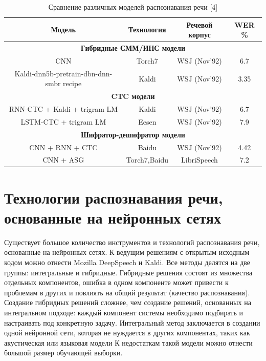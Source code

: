 \documentclass[conference]{IEEEtran}
\begin{document}
    \begin{table}[htp]
        \caption{Сравнение различных моделей распознавания речи [4]}
        \begin{center}
            \begin{tabular}{|c|c|c|c|}
                \hline
                Модель & Технология & Речевой корпус & WER \% \\
                \hline
                \multicolumn{4}{|c|}{\textbf{Гибридные СММ/ИНС модели}} \\
                \hline
                CNN & Torch7 & WSJ (Nov’92) & 6.7 \\
                \hline
                Kaldi-dnn5b-pretrain-dbn-dnn-smbr recipe & Kaldi & WSJ (Nov’92) & 3.35 \\
                \hline
                \multicolumn{4}{|c|}{\textbf{CTC модели}} \\
                \hline
                RNN-CTC + Kaldi + trigram LM & Kaldi & WSJ (Nov’92) & 6.7 \\
                \hline
                LSTM-CTC + trigram LM & Eesen & WSJ (Nov’92) & 7.9 \\
                \hline
                \multicolumn{4}{|c|}{\textbf{Шифратор-дешифратор модели}} \\
                \hline
                CNN + RNN + CTC & Baidu & WSJ (Nov’92) & 4.42 \\
                \hline
                CNN + ASG & Torch7,Baidu & LibriSpeech & 7.2 \\
                \hline
            \end{tabular}
            \label{tab1}
        \end{center}
    \end{table}


    \section{Технологии распознавания речи, основанные на нейронных сетях}
    Существует большое количество инструментов и технологий распознавания речи, основанные на нейронных сетях.
    К ведущим решениям с открытым исходным кодом можно отнести Mozilla DeepSpeech и Kaldi.
    Все методы делятся на две группы: интегральные и гибридные.
    Гибридные решения состоят из множества отдельных компонентов, ошибка в одном компоненте может привести к проблемам в других и повлиять на общий результат (качество распознавания).
    Создание гибридных решений сложнее, чем создание решений, основанных на интегральном подходе: каждый компонент системы необходимо подбирать и настраивать под конкретную задачу.
    Интегральный метод заключается в создании одной нейронной сети, которая не нуждается в других компонентах, таких как акустическая или языковая модели
    К недостаткам такой модели можно отнести большой размер обучающей выборки.
\end{document}
